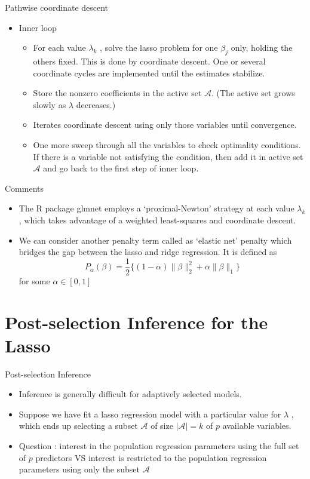 \documentclass[11pt]{beamer}
\newcommand{\A}{\mathcal{A}}
\begin{document}
\begin{frame}{Pathwise coordinate descent}
    \begin{itemize}
        \item Inner loop
        \begin{itemize}
            \item For each value $\lambda_k$ , solve the lasso problem for one $\beta_j$ only, holding the others fixed. This is done by coordinate descent. One or several coordinate cycles are implemented until the estimates stabilize.
            \item Store the nonzero coefficients in the active set $\A$. (The active set grows slowly as $\lambda$ decreases.)
            \item Iterates coordinate descent using only those variables until convergence.
            \item One more sweep through all the variables to check optimality conditions. If there is a variable not satisfying the condition, then add it in active set $\A$ and go back to the first step of inner loop.
        \end{itemize}
    \end{itemize}
\end{frame}

\begin{frame}{Comments}
    \begin{itemize}
        \item The R package glmnet employs a `proximal-Newton' strategy at each value $\lambda_k$, which takes advantage of a weighted least-squares and coordinate descent.
        \item We can consider another penalty term called as `elastic net' penalty which bridges the gap between the lasso and ridge regression. It is defined as $$P_\alpha(\beta)=\frac 12 \{(1-\alpha)\|\beta\|_2^2 +\alpha \|\beta\|_1 \} $$ for some $\alpha\in [0,1]$
    \end{itemize}
\end{frame}

\section{Post-selection Inference for the Lasso}
\begin{frame}{Post-selection Inference}
    \begin{itemize}
        \item Inference is generally difficult for adaptively selected models.
        \item Suppose we have fit a lasso regression model with a particular value for $\lambda$ , which ends up selecting a subset $\A$ of size $|\A|=k$ of $p$ available variables. 
        \item Question : interest in the population regression parameters using the full set of $p$ predictors VS interest is restricted to the population regression parameters using only the subset $\A$
    \end{itemize}
\end{frame}
\end{document}
